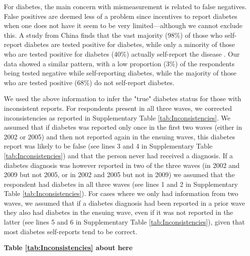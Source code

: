 \documentclass[10pt,letterpaper]{article}
\begin{document}
\begin{appendix}
	For diabetes, the main concern with mismeasurement is related to false negatives. False positives are deemed less of a problem since incentives to report diabetes when one does not have it seem to be very limited---although we cannot exclude this.  A study from China finds that the vast majority (98\%) of those who self-report diabetes are tested positive for diabetes, while only a minority  of those who are tested positive for diabetes (40\%) actually self-report the disease \cite{Yuan2015}.  Our data showed a similar pattern, with a low proportion (3\%) of the respondents being tested negative while self-reporting diabetes, while the majority of those who are tested positive (68\%) do not self-report diabetes.
	
	We used the above information to infer the "true" diabetes status for those with inconsistent reports. For respondents present in all three waves, we corrected inconsistencies as reported in Supplementary Table \ref{tab:Inconsistencies}. We assumed that if diabetes was reported only once in the first two waves (either in 2002 or 2005) and then not reported again in the ensuing waves, this diabetes report was likely to be false (see lines 3 and 4 in Supplementary Table \ref{tab:Inconsistencies}) and that the person never had received a diagnosis. If a diabetes diagnosis was however reported in two of the three waves (in 2002 and 2009 but not 2005, or in 2002 and 2005 but not in 2009) we assumed that the respondent had diabetes in all three waves (see lines 1 and 2 in Supplementary Table \ref{tab:Inconsistencies}). For cases where we only had information from two waves, we assumed that if a diabetes diagnosis had been reported in a prior wave they also had diabetes in the ensuing wave, even if it was not reported in the latter (see lines 5 and 6 in Supplementary Table \ref{tab:Inconsistencies}), given that most diabetes self-reports tend to be correct.
	
	
	\begin{center}
		\textbf{Table \ref{tab:Inconsistencies} about here}
	\end{center}
	
	
	

\end{appendix}
\end{document}
